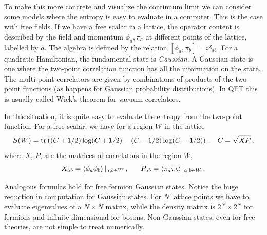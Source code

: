 \documentclass[11pt]{article}
\numberwithin{equation}{section}
\begin{document}
To make this more concrete and visualize the continuum limit we can consider some models where the entropy is easy to evaluate in a computer. This is the case with free fields. If we have a free scalar in a lattice, the operator content is described by the field and momentum ${\phi_a,\pi_a}$ at different points of the lattice, labelled by $a$. The algebra is defined by the relation $[\phi_a,\pi_b]=i \delta_{ab}$. For a quadratic Hamiltonian, the fundamental state is {\sl Gaussian}. A Gaussian state is one where the two-point correlation function has all the information on the state. The multi-point correlators are given by combinations of products of the two-point functions (as happens for Gaussian probability distributions). In QFT this is usually called Wick's theorem for vacuum correlators.

In this situation, it is quite easy to evaluate the entropy from the two-point function. For a free scalar, we have for a region $W$ in the lattice
\begin{equation}
S(W)=\textrm{tr}\left(( C+1/2)\log (C+1/2)-(C-1/2)\log (C-1/2)\right)\,,\hspace{.3cm} C=\sqrt{X P}\,,  \label{for}
\end{equation}
where $X$, $P$, are the matrices of correlators in the region $W$,
\begin{equation}
X_{ab}=\left\langle \phi _{a}\phi _{b}\right\rangle|_{a,b \in W}  \,, \hspace{.6cm}  P_{ab}=\left\langle \pi _{a}\pi _{b}\right\rangle|_{a,b \in W}  \,. 
\end{equation}

Analogous formulas hold for free fermion Gaussian states. Notice the huge reduction in computation for Gaussian states. For $N$ lattice points we have to evaluate eigenvalues of a $N\times N$ matrix, while the density matrix is $2^N\times 2^N$ for fermions and infinite-dimensional for bosons. Non-Gaussian states, even for free theories, are not simple to treat numerically.  
\end{document}
